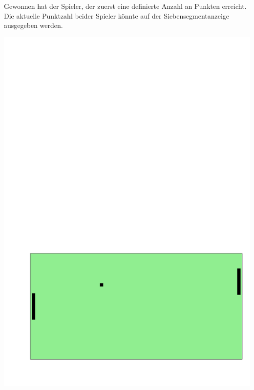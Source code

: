 Gewonnen hat der Spieler, der zuerst eine definierte Anzahl an Punkten erreicht.
Die aktuelle Punktzahl beider Spieler könnte auf der Siebensegmentanzeige ausgegeben werden.
\begin{center}
\includegraphics[scale=0.4]{figures/pong}
\end{center}



